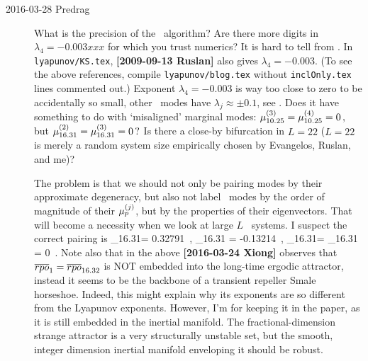 \begin{description}
\item[2016-03-28 Predrag]
What is the precision of the \cLvs\ algorithm?
Are there more digits in $\lambda_4= -0.003xxx$ for which you trust numerics?
It is hard to tell from .
In \texttt{lyapunov/KS.tex}, {\bf [2009-09-13 Ruslan]} also gives
$\lambda_4= -0.003$.
(To see the above references, compile \texttt{lyapunov/blog.tex}
without \texttt{inclOnly.tex} lines commented out.)
Exponent $\lambda_4= -0.003$ is way too close to zero to be accidentally
so small, other \entangled\ modes have $\lambda_j \approx \pm 0.1$, see
. Does it have something to do with
`misaligned' marginal modes:
\(
\eigRe[3]_{10.25}= \eigRe[4]_{10.25} = 0
\,,
\)
but
\(
\eigRe[2]_{16.31}= \eigRe[3]_{16.31} = 0
\,?
\)
Is there a close-by bifurcation in $L=22$ ($L=22$  is merely a random system
size empirically chosen by Evangelos, Ruslan, and me)?

The problem is that we should not only be pairing modes by their
approximate  degeneracy, but also not label \entangled\ modes by
the order of magnitude of their $\eigRe[j]_{p}$, but by the properties of
their eigenvectors. That will become a necessity when we look at large
$L$ \KS\ systems. I suspect the correct pairing is
\beq
\eigRe[1]_{16.31}= 0.32791
\,,\quad
\eigRe[2]_{16.31} = -0.13214
\,,\quad
\eigRe[3]_{16.31}= \eigRe[4]_{16.31} = 0
\,.
Note also that in the above {\bf [2016-03-24 Xiong]} observes that
$\overline{rpo}_{1}=\overline{rpo}_{16.32}$ is NOT embedded into the long-time ergodic
attractor, instead it seems to be the backbone of a transient repeller
Smale horseshoe. Indeed, this might explain why its exponents are so
different from the Lyapunov exponents. However, I'm for keeping it in the
paper, as it is still embedded in the inertial manifold. The
fractional-dimension strange attractor is a very structurally unstable
set, but the smooth, integer dimension inertial manifold enveloping it
should be robust.



\end{description}
